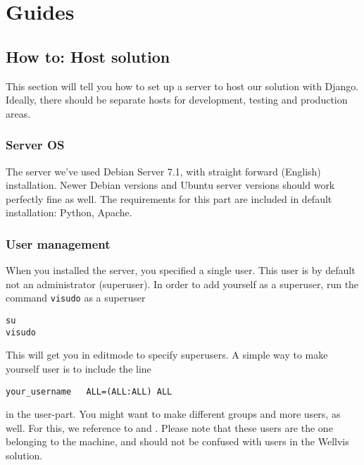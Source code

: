 \documentclass{report}
\begin{document}
\chapter{Guides} \label{cha:guides}

\newpage
\section{How to: Host solution} \label{sec:host_solution}
This section will tell you how to set up a server to host our solution with Django. Ideally, there should be separate hosts for development, testing and production areas.

\subsection{Server OS}
The server we’ve used Debian Server 7.1, with straight forward (English) installation. Newer Debian versions and Ubuntu server versions should work perfectly fine as well. The requirements for this part are included in default installation: Python, Apache.
\subsection{User management}
When you installed the server, you specified a single user. This user is by default not an administrator (superuser). In order to add yourself as a superuser, run the command \verb|visudo| as a superuser
\begin{verbatim}
su 
visudo
\end{verbatim}
This will get you in editmode to specify superusers. A simple way to make yourself user is to include the line
\begin{verbatim}
your_username   ALL=(ALL:ALL) ALL
\end{verbatim}
in the user-part. You might want to make different groups and more users, as well. For this, we reference to \cite{website:debian-sudo} and \cite{website:debian-usermanagement}. Please note that these users are the one belonging to the machine, and should not be confused with users in the Wellvis solution. 
\end{document}
